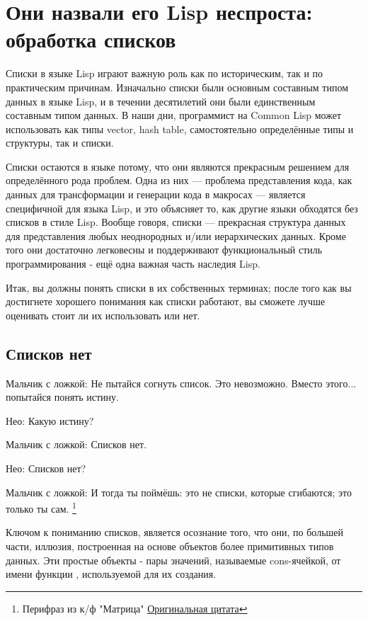 \chapter{Они назвали его Lisp неспроста: обработка списков}
\label{ch:12}

Списки в языке Lisp играют важную роль как по историческим, так и по практическим
причинам. Изначально списки были основным составным типом данных в языке Lisp, и в течении
десятилетий они были единственным составным типом данных. В наши дни, программист на
Common Lisp может использовать как типы vector, hash table, самостоятельно определённые
типы и структуры, так и списки.

Списки остаются в языке потому, что они являются прекрасным решением для определённого
рода проблем. Одна из них --- проблема представления кода, как данных для трансформации и
генерации кода в макросах --- является специфичной для языка Lisp, и это объясняет то, как
другие языки обходятся без списков в стиле Lisp. Вообще говоря, списки --- прекрасная
структура данных для представления любых неоднородных и/или иерархических данных. Кроме
того они достаточно легковесны и поддерживают функциональный стиль программирования - ещё
одна важная часть наследия Lisp.

Итак, вы должны понять списки в их собственных терминах; после того как вы достигнете
хорошего понимания как списки работают, вы сможете лучше оценивать стоит ли их
использовать или нет.

\section{Списков нет}

Мальчик с ложкой: Не пытайся согнуть список. Это невозможно. Вместо этого... попытайся
понять истину.

Нео: Какую истину?

Мальчик с ложкой: Списков нет.

Нео: Списков нет?

Мальчик с ложкой: И тогда ты поймёшь: это не списки, которые сгибаются; это только ты
сам. \footnote{Перифраз из к/ф "Матрица"
  \href{http://us.imdb.com/Quotes?0133093}{Оригинальная цитата}}

Ключом к пониманию списков, является осознание того, что они, по большей части, иллюзия,
построенная на основе объектов более примитивных типов данных. Эти простые объекты - пары
значений, называемые cons-ячейкой, от имени функции , используемой для их
создания.

